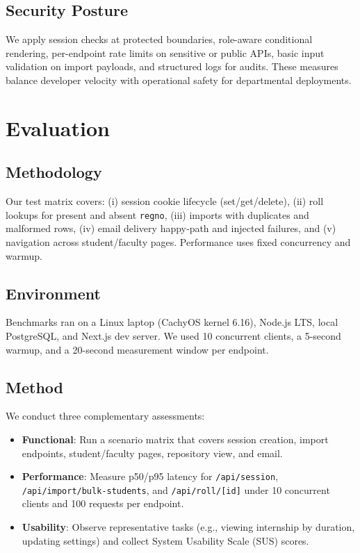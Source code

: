 \documentclass[conference]{IEEEtran}
\begin{document}
\subsection{Security Posture}
We apply session checks at protected boundaries, role-aware conditional rendering, per-endpoint rate limits on sensitive or public APIs, basic input validation on import payloads, and structured logs for audits. These measures balance developer velocity with operational safety for departmental deployments.

\section{Evaluation}
\subsection{Methodology}
Our test matrix covers: (i) session cookie lifecycle (set/get/delete), (ii) roll lookups for present and absent \texttt{regno}, (iii) imports with duplicates and malformed rows, (iv) email delivery happy‑path and injected failures, and (v) navigation across student/faculty pages. Performance uses fixed concurrency and warmup.
\subsection{Environment}
Benchmarks ran on a Linux laptop (CachyOS kernel 6.16), Node.js LTS, local PostgreSQL, and Next.js dev server. We used 10 concurrent clients, a 5-second warmup, and a 20-second measurement window per endpoint.
\subsection{Method}
We conduct three complementary assessments:
\begin{itemize}[leftmargin=*,nosep]
  \item \textbf{Functional}: Run a scenario matrix that covers session creation, import endpoints, student/faculty pages, repository view, and email.
  \item \textbf{Performance}: Measure p50/p95 latency for \texttt{/api/session}, \texttt{/api/import/bulk-students}, and \texttt{/api/roll/[id]} under 10 concurrent clients and 100 requests per endpoint.
  \item \textbf{Usability}: Observe representative tasks (e.g., viewing internship by duration, updating settings) and collect System Usability Scale (SUS) scores.
\end{itemize}
\end{document}

